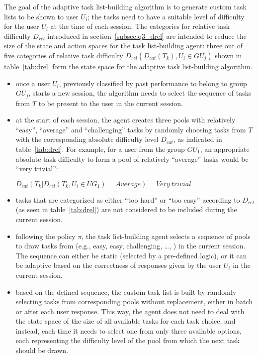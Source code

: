 The goal of the adaptive task list-building algorithm is to generate custom task lists to be shown to user $U_i$;
the tasks need to have a suitable level of difficulty for the user $U_i$ at the time of each session.
The categories for relative task difficulty $D_{rel}$ introduced in section~\ref{subsec:q3_drel} are intended to reduce the size of the state and action spaces for the task list-building agent: three out of five categories of relative task difficulty $D_{rel}(D_{cat}(T_k), U_i \in GU_j)$ shown in table~\ref{tab:drel} form the state space for the adaptive task list-building algorithm.

\begin{itemize}
    \item once a user $U_i$, previously classified by past performance to belong to group $GU_j$, starts a new session, the algorithm needs to select the sequence of tasks from $T$ to be present to the user in the current session.
    \item at the start of each session, the agent creates three pools with relatively ``easy'', ``average'' and ``challenging'' tasks by randomly choosing tasks from $T$ with the corresponding absolute difficulty level $D_{cat}$, as indicated in table~\ref{tab:drel}.
    For example, for a user from the group $GU_1$, an appropriate absolute task difficulty to form a pool of relatively ``average'' tasks would be ``very trivial'':

    $D_{cat}(T_k | D_{rel}(T_k, U_i \in UG_1 ) = Average) = Very~trivial$

    \item tasks that are categorized as either ``too hard'' or ``too easy'' according to $D_{rel}$ (as seen in table~\ref{tab:drel}) are not considered to be included during the current session.
    \item following the policy $\pi$, the task list-building agent selects a sequence of pools to draw tasks from (e.g., easy, easy, challenging, \ldots, ) in the current session.
    The sequence can either be static (selected by a pre-defined logic), or it can be adaptive based on the correctness of responses given by the user $U_i$ in the current session.
    \item based on the defined sequence, the custom task list is built by randomly selecting tasks from corresponding pools without replacement, either in batch or after each user response.
    This way, the agent does not need to deal with the state space of the size of all available tasks for each task choice, and instead, each time it needs to select one from only three available options, each representing the difficulty level of the pool from which the next task should be drawn.
\end{itemize}

